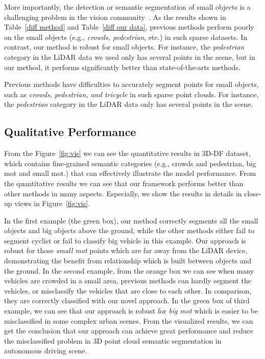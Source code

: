 \documentclass{sip}%
\begin{document}
More importantly, the detection or semantic segmentation of small objects is a challenging problem in the vision community~\cite{kampffmeyer2016semantic,lin2017feature,wang2018understanding}. 
As the results shown in Table~\ref{diff method} and Table~\ref{diff our data}, previous methods perform poorly on the small objects (e.g., \emph{crowds, pedestrian}, etc.) in such sparse datasets. 
In contrast, our method is robust for small objects. For instance, the \emph{pedestrian} category in the LiDAR data we used only has several points in the scene, but in our method, it performs significantly better than state-of-the-arts methods.


Previous methods have difficulties to accurately segment points for small objects, such as \emph{crowds, pedestrian, and tricycle} in such sparse point clouds.
For instance, the \emph{pedestrian} category in the LiDAR data only has several points in the scene.
%







\subsection{Qualitative Performance}

From the Figure~\ref{fig:vis} we can see the quantitative results in 3D-DF dataset, which contains fine-grained semantic categories (e.g., crowds and pedestrian, big mot and small mot.) that can effectively illustrate the model performance.
From the quantitative results we can see that our framework performs better than other methods in many aspects.
Especially, we show the results in details in close-up views in Figure~\ref{fig:vis}.

In the first example (the green box), our method correctly segments all the small objects and big objects above the ground, while the other methods either fail to segment cyclist or fail to classify big vehicle in this example.
Our approach is robust for those \emph{small mot} points which are far away from the LiDAR device, demonstrating the benefit from relationship which is built between objects and the ground.
In the second example, from the orange box we can see when many vehicles are crowded in a small area, previous methods can hardly segment the vehicles, or misclassify the vehicles that are close to each other.
In comparison, they are correctly classified with our novel approach.
%
In the green box of third example, we can see that our approach is robust for \emph{big mot} which is easier to be misclassified in some complex urban scenes. From the visualized results, we can get the conclusion that our approach can achieve great performance and reduce the misclassified problem in 3D point cloud semantic segmentation in autonomous driving scene.
\end{document}
